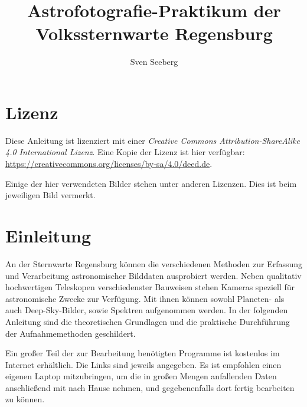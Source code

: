 \documentclass[10pt,a4paper,titlepage]{article}
\begin{document}
\begin{titlepage}
\author[1]{Sven Seeberg}
\title{Astrofotografie-Praktikum der Volkssternwarte Regensburg}
\end{titlepage}
\maketitle

\tableofcontents
\section{Lizenz}
Diese Anleitung ist lizenziert mit einer \textit{Creative Commons Attribution-ShareAlike 4.0 International Lizenz}. Eine Kopie der Lizenz ist hier verfügbar: \url{https://creativecommons.org/licenses/by-sa/4.0/deed.de}.

Einige der hier verwendeten Bilder stehen unter anderen Lizenzen. Dies ist beim jeweiligen Bild vermerkt.


\section{Einleitung}
An der Sternwarte Regensburg können die verschiedenen Methoden zur Erfassung und Verarbeitung astronomischer Bilddaten ausprobiert werden. Neben qualitativ hochwertigen Teleskopen verschiedenster Bauweisen stehen Kameras speziell für astronomische Zwecke zur Verfügung. Mit ihnen können sowohl Planeten- als auch Deep-Sky-Bilder, sowie Spektren aufgenommen werden. In der folgenden Anleitung sind die theoretischen Grundlagen und die praktische Durchführung der Aufnahmemethoden geschildert.

Ein großer Teil der zur Bearbeitung benötigten Programme ist kostenlos im Internet erhältlich. Die Links sind jeweils angegeben. Es ist empfohlen einen eigenen Laptop mitzubringen, um die in großen Mengen anfallenden Daten anschließend mit nach Hause nehmen, und gegebenenfalls dort fertig bearbeiten zu können.
\end{document}
